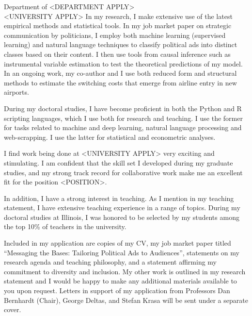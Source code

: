 \documentclass[12pt]{letter}
\begin{document}
\begin{letter}{Department of <DEPARTMENT APPLY>\\
<UNIVERSITY APPLY>}
In my research, I make extensive use of the latest empirical methods and statistical tools.
In my job market paper on strategic communication by politicians, I employ both machine learning (supervised learning) and natural language techniques to classify political ads into distinct classes based on their content.
I then use tools from causal inference such as instrumental variable estimation to test the theoretical predictions of my model.
In an ongoing work, my co-author and I use both reduced form and structural methods to estimate the switching costs that emerge from airline entry in new airports.

During my doctoral studies, I have become proficient in both the Python and R scripting languages, which I use both for research and teaching.
I use the former for tasks related to machine and deep learning, natural language processing and web-scrapping.
I use the latter for statistical and econometric analyses.

I find work being done at <UNIVERSITY APPLY> very exciting and stimulating.
I am confident that the skill set I developed during my graduate studies, and my strong track record for collaborative work make me an excellent fit for the position <POSITION>.


In addition, I have a strong interest in teaching.
As I mention in my teaching statement, I have extensive teaching experience in a range of topics.
During my doctoral studies at Illinois, I was honored to be selected by my students among the top 10\% of teachers in the university.



Included in my application are copies of my CV, my job market paper titled ``Messaging the Bases: Tailoring Political Ads to Audiences'',
statements on my research agenda and teaching philosophy, and a statement affirming my commitment to diversity and inclusion.
My other work is outlined in my research statement and I would be happy to make any additional materials available to you upon request.
Letters in support of my application from Professors Dan Bernhardt (Chair), George Deltas, and Stefan Krasa will be sent under a separate cover. 


\end{letter}
\end{document}
